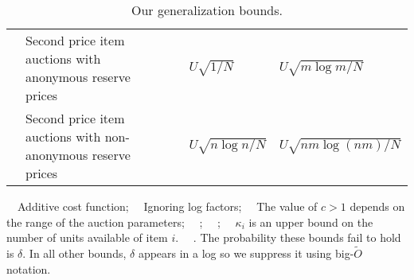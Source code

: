 \begin{table}
\begin{minipage}{\columnwidth}
\begin{center}
\begin{tabularx}{\textwidth}{L{0.55} L{1.8} L{0} L{1.25} L{1.4}}
				 & Second price item auctions with anonymous reserve prices &&$U\sqrt{1/N}$ &$U\sqrt{m \log m/N}$\footnotemark[4]\\
				& Second price item auctions with non-anonymous reserve prices &&$U\sqrt{n \log n/N} $ &$U\sqrt{nm \log (nm)/N}$\footnotemark[4]\\\bottomrule
			\end{tabularx}
		\end{center}
	\end{minipage}
	
	\noindent\par
	{\center
		\scriptsize
		\footnotemark[1]~~{Additive cost function};\quad
		\footnotemark[2]~~{Ignoring log factors};\quad
		\footnotemark[6]~~{The value of $c > 1$ depends on the range of the auction parameters};\newline
		\footnotemark[4]~~{\citet{Morgenstern16:Learning}};\quad
		\footnotemark[5]~~{\citet{Balcan16:Sample}};\quad
		\footnotemark[3]~~{$\kappa_i$ is an upper bound on the number of units available of item $i$.}
		\footnotemark[7]~~{\citet{Syrgkanis17:Sample}. The probability these bounds fail to hold is $\delta$. In all other bounds, $\delta$ appears in a log so we suppress it using big-$\tilde O$ notation.}
	}
	\smallskip
	\caption{Our generalization bounds.}\label{tab:results_app}
\end{table}%
